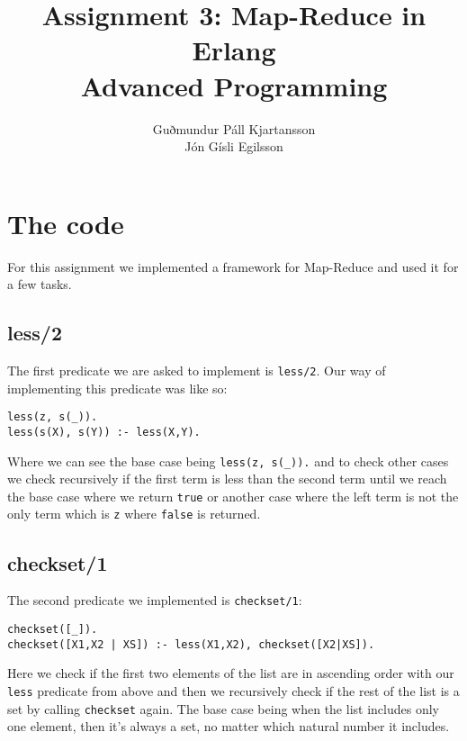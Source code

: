 \documentclass[a4paper,10pt]{article}
\title{
	Assignment 3: Map-Reduce in Erlang\\
	Advanced Programming
  }
\author{
	Guðmundur Páll Kjartansson\\
	Jón Gísli Egilsson	
}
\begin{document}
\maketitle

\section{The code}

For this assignment we implemented a framework for Map-Reduce and used it for a few tasks.

\subsection{less/2}
The first predicate we are asked to implement is \verb=less/2=. Our way of implementing this predicate was like so:
\begin{verbatim}
less(z, s(_)).
less(s(X), s(Y)) :- less(X,Y).
\end{verbatim}
Where we can see the base case being \verb=less(z, s(_)).= and to check other cases we check recursively if the first term is less than the second term until we reach the base case where we return \verb=true= or another case where the left term is not the only term which is \verb=z= where \verb=false= is returned.

\subsection{checkset/1}
The second predicate we implemented is \verb=checkset/1=:
\begin{verbatim}
checkset([_]).
checkset([X1,X2 | XS]) :- less(X1,X2), checkset([X2|XS]).
\end{verbatim}
Here we check if the first two elements of the list are in ascending order with our \verb=less= predicate from above and then we recursively check if the rest of the list is a set by calling \verb=checkset= again. The base case being when the list includes only one element, then it's always a set, no matter which natural number it includes.
\end{document}

